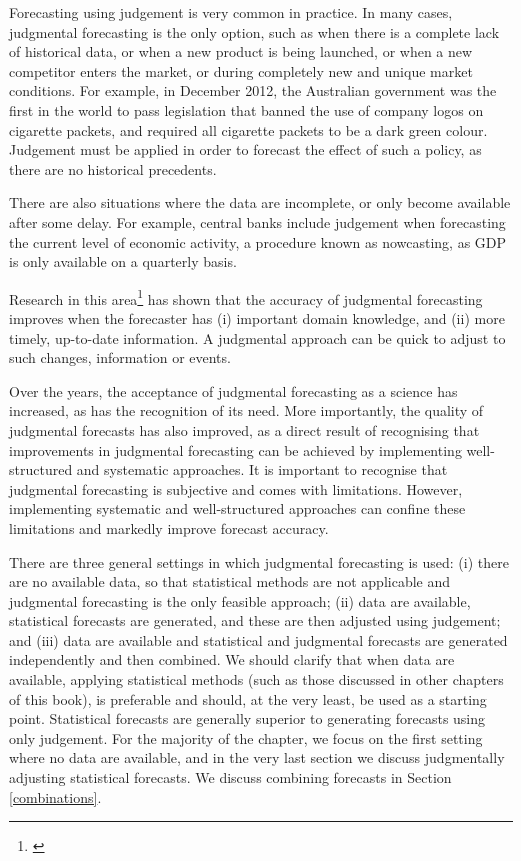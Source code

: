 \documentclass[]{book}
\let\rmarkdownfootnote\footnote%
\def\footnote{\protect\rmarkdownfootnote}
\begin{document}
Forecasting using judgement is very common in practice. In many cases, judgmental forecasting is the only option, such as when there is a complete lack of historical data, or when a new product is being launched, or when a new competitor enters the market, or during completely new and unique market conditions. For example, in December 2012, the Australian government was the first in the world to pass legislation that banned the use of company logos on cigarette packets, and required all cigarette packets to be a dark green colour. Judgement must be applied in order to forecast the effect of such a policy, as there are no historical precedents.

There are also situations where the data are incomplete, or only become available after some delay. For example, central banks include judgement when forecasting the current level of economic activity, a procedure known as nowcasting, as GDP is only available on a quarterly basis.

Research in this area\footnote{\citet{Lawrence2006}} has shown that the accuracy of judgmental forecasting improves when the forecaster has (i) important domain knowledge, and (ii) more timely, up-to-date information. A judgmental approach can be quick to adjust to such changes, information or events.

Over the years, the acceptance of judgmental forecasting as a science has increased, as has the recognition of its need. More importantly, the quality of judgmental forecasts has also improved, as a direct result of recognising that improvements in judgmental forecasting can be achieved by implementing well-structured and systematic approaches. It is important to recognise that judgmental forecasting is subjective and comes with limitations. However, implementing systematic and well-structured approaches can confine these limitations and markedly improve forecast accuracy.

There are three general settings in which judgmental forecasting is used: (i) there are no available data, so that statistical methods are not applicable and judgmental forecasting is the only feasible approach; (ii) data are available, statistical forecasts are generated, and these are then adjusted using judgement; and (iii) data are available and statistical and judgmental forecasts are generated independently and then combined. We should clarify that when data are available, applying statistical methods (such as those discussed in other chapters of this book), is preferable and should, at the very least, be used as a starting point. Statistical forecasts are generally superior to generating forecasts using only judgement. For the majority of the chapter, we focus on the first setting where no data are available, and in the very last section we discuss judgmentally adjusting statistical forecasts. We discuss combining forecasts in Section \ref{combinations}.
\end{document}
